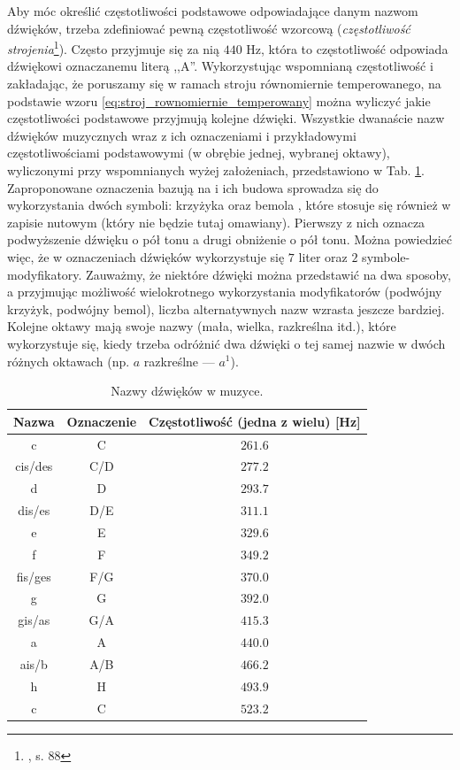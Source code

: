 Aby móc określić częstotliwości podstawowe odpowiadające danym nazwom dźwięków, trzeba zdefiniować pewną częstotliwość wzorcową (\emph{częstotliwość strojenia}\footnote{\cite{lerch_introduction_2012}, s. 88}). Często przyjmuje się za nią $440$ Hz, która to częstotliwość odpowiada dźwiękowi oznaczanemu literą ,,A''. Wykorzystując wspomnianą częstotliwość i zakładając, że poruszamy się w ramach stroju równomiernie temperowanego, na podstawie wzoru \ref{eq:stroj_rownomiernie_temperowany} można wyliczyć jakie częstotliwości podstawowe przyjmują kolejne dźwięki. Wszystkie dwanaście nazw dźwięków muzycznych wraz z ich oznaczeniami i przykładowymi częstotliwościami podstawowymi (w obrębie jednej, wybranej oktawy), wyliczonymi przy wspomnianych wyżej założeniach, przedstawiono w Tab. \ref{tab:nazwy_dzwiekow}. Zaproponowane oznaczenia bazują na \cite{lerch_introduction_2012} i ich budowa sprowadza się do wykorzystania dwóch symboli: krzyżyka \musSharp{} oraz bemola \musFlat{}, które stosuje się również w zapisie nutowym (który nie będzie tutaj omawiany). Pierwszy z nich oznacza podwyższenie dźwięku o pół tonu a drugi obniżenie o pół tonu. Można powiedzieć więc, że w oznaczeniach dźwięków wykorzystuje się $7$ liter oraz $2$ symbole-modyfikatory. Zauważmy, że niektóre dźwięki można przedstawić na dwa sposoby, a przyjmując możliwość wielokrotnego wykorzystania modyfikatorów (podwójny krzyżyk, podwójny bemol), liczba alternatywnych nazw wzrasta jeszcze bardziej. Kolejne oktawy mają swoje nazwy (mała, wielka, razkreślna itd.), które wykorzystuje się, kiedy trzeba odróżnić dwa dźwięki o tej samej nazwie w dwóch różnych oktawach (np. $a$ razkreślne --- $a^1$).

\begin{table}[htb]
    \centering
    \caption{Nazwy dźwięków w muzyce.}
    \label{tab:nazwy_dzwiekow}
    \begin{tabular}{|c|c|c|} \hline
        Nazwa & Oznaczenie & Częstotliwość (jedna z wielu) [Hz] \\ \hline
        c       & C     & $261.6$  \\
        cis/des & C\sh{}/D\fl{} & $277.2$  \\
        d       & D     & $293.7$  \\
        dis/es  & D\sh{}/E\fl{} & $311.1$  \\
        e       & E     & $329.6$  \\
        f       & F     & $349.2$  \\
        fis/ges & F\sh{}/G\fl{} & $370.0$  \\
        g       & G     & $392.0$  \\
        gis/as  & G\sh{}/A\fl{} & $415.3$  \\
        a       & A     & $440.0$  \\
        ais/b   & A\sh{}/B  & $466.2$  \\
        h       & H     & $493.9$  \\
        c       & C     & $523.2$  \\ \hline
    \end{tabular}
\end{table}

